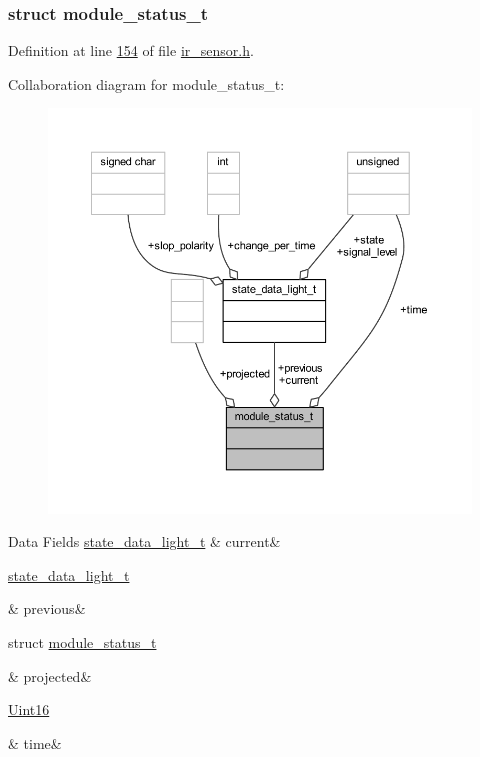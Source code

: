 \subsubsection{struct module\+\_\+status\+\_\+t}


Definition at line \hyperlink{a00017_source_l00154}{154} of file \hyperlink{a00017_source}{ir\+\_\+sensor.\+h}.



Collaboration diagram for module\+\_\+status\+\_\+t\+:\nopagebreak
\begin{figure}[H]
\begin{center}
\leavevmode
\includegraphics[width=350pt]{d6/d66/a00916}
\end{center}
\end{figure}
\begin{DoxyFields}{Data Fields}
\hypertarget{a00017_ab8af48cdbba92b3ae39c4470e53af944}{\hyperlink{a00017_d8/d7f/a00787}{state\+\_\+data\+\_\+light\+\_\+t}}\label{a00017_ab8af48cdbba92b3ae39c4470e53af944}
&
current&
\\
\hline

\hypertarget{a00017_a0fc6d9ce6203a17f672c19d3d8747aee}{\hyperlink{a00017_d8/d7f/a00787}{state\+\_\+data\+\_\+light\+\_\+t}}\label{a00017_a0fc6d9ce6203a17f672c19d3d8747aee}
&
previous&
\\
\hline

\hypertarget{a00017_a6b2516d74583418cec324c50041421c9}{struct \hyperlink{a00017_d6/d75/a00604}{module\+\_\+status\+\_\+t}}\label{a00017_a6b2516d74583418cec324c50041421c9}
&
projected&
\\
\hline

\hypertarget{a00017_ad496f33595a12b00015d6778e594321c}{\hyperlink{a00072_a59a9f6be4562c327cbfb4f7e8e18f08b}{Uint16}}\label{a00017_ad496f33595a12b00015d6778e594321c}
&
time&
\\
\hline

\end{DoxyFields}
\label{db/deb/a00853}
\hypertarget{a00017_db/deb/a00853}{}
